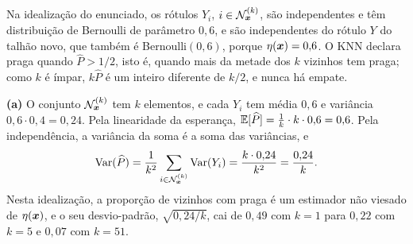 \begin{solucao}
Na idealização do enunciado, os rótulos $Y_i$, $i\in\mathcal{N}_{\bm{x}}^{(k)}$, são independentes e
têm distribuição de Bernoulli de parâmetro $0{,}6$, e são independentes do rótulo $Y$ do talhão
novo, que também é Bernoulli$(0{,}6)$, porque $\eta(\bm{x})=0{,}6$. O KNN declara praga quando
$\widehat P>1/2$, isto é, quando mais da metade dos $k$ vizinhos tem praga; como $k$ é ímpar,
$k\widehat P$ é um inteiro diferente de $k/2$, e nunca há empate.

\smallskip
\textbf{(a)} O conjunto $\mathcal{N}_{\bm{x}}^{(k)}$ tem $k$ elementos, e cada $Y_i$ tem média
$0{,}6$ e variância $0{,}6\cdot0{,}4=0{,}24$. Pela linearidade da esperança,
$\mathbb{E}[\widehat P]=\frac1k\cdot k\cdot0{,}6=0{,}6$. Pela independência, a variância da soma é a
soma das variâncias, e
\[
  \operatorname{Var}(\widehat P)=\frac1{k^2}\sum_{i\in\mathcal{N}_{\bm{x}}^{(k)}}\operatorname{Var}(Y_i)
  =\frac{k\cdot0{,}24}{k^2}=\frac{0{,}24}{k} .
\]
Nesta idealização, a proporção de vizinhos com praga é um estimador não viesado de $\eta(\bm{x})$,
e o seu desvio-padrão, $\sqrt{0{,}24/k}$, cai de $0{,}49$ com $k=1$ para $0{,}22$ com $k=5$ e
$0{,}07$ com $k=51$.


\end{solucao}
